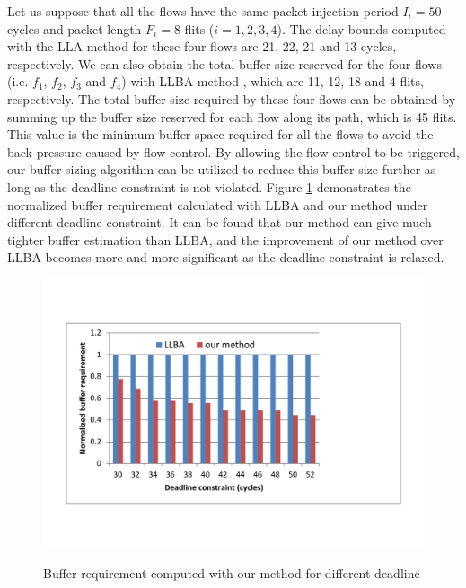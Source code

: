 \documentclass[preprint]{elsarticle}
\begin{document}
Let us suppose that all the flows have the same packet injection period $I_i=50$ cycles and packet length $F_i=8$ flits ($i=1,2,3,4$). The delay bounds computed with the LLA method \cite{73} for these four flows are 21, 22, 21 and 13 cycles, respectively. We can also obtain the total buffer size reserved for the four flows (i.e. $f_1$, $f_2$, $f_3$ and $f_4$) with LLBA method \cite{189}, which are 11, 12, 18 and 4 flits, respectively. The total buffer size required by these four flows can be obtained by summing up the buffer size reserved for each flow along its path, which is 45 flits. This value is the minimum buffer space required for all the flows to avoid the back-pressure caused by flow control. By allowing the flow control to be triggered, our buffer sizing algorithm can be utilized to reduce this buffer size further as long as the deadline constraint is not violated. Figure \ref{LLBAvsRTC} demonstrates the normalized buffer requirement calculated with LLBA and our method under different deadline constraint. It can be found that our method can give much tighter buffer estimation than LLBA, and the improvement of our method over LLBA becomes more and more significant as the deadline constraint is relaxed.
\begin{figure}
  \centering
  \includegraphics[scale=0.55]{figures/bufopt.pdf}\\
  \caption{Buffer requirement computed with our method for different deadline}\label{LLBAvsRTC}
\end{figure}
\end{document}
